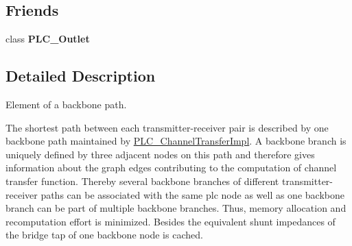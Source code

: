 \subsection*{\-Friends}
\begin{DoxyCompactItemize}
\item 
\hypertarget{classns3_1_1PLC__BackboneBranch_ae6906119e2bc3e6a134b7087a1ad1afe}{class {\bfseries \-P\-L\-C\-\_\-\-Outlet}}\label{classns3_1_1PLC__BackboneBranch_ae6906119e2bc3e6a134b7087a1ad1afe}

\end{DoxyCompactItemize}


\subsection{\-Detailed \-Description}
\-Element of a backbone path. 

\-The shortest path between each transmitter-\/receiver pair is described by one backbone path maintained by \hyperlink{classns3_1_1PLC__ChannelTransferImpl}{\-P\-L\-C\-\_\-\-Channel\-Transfer\-Impl}. \-A backbone branch is uniquely defined by three adjacent nodes on this path and therefore gives information about the graph edges contributing to the computation of channel transfer function. \-Thereby several backbone branches of different transmitter-\/receiver paths can be associated with the same plc node as well as one backbone branch can be part of multiple backbone branches. \-Thus, memory allocation and recomputation effort is minimized. \-Besides the equivalent shunt impedances of the bridge tap of one backbone node is cached. 


